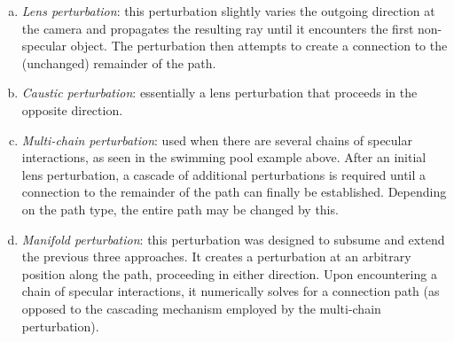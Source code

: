 \begin{enumerate}[(a)]
\item \emph{Lens perturbation}: this perturbation slightly varies the outgoing
direction at the camera and propagates the resulting ray until it encounters
the first non-specular object. The perturbation then attempts to create a connection to the
(unchanged) remainder of the path.
\item \emph{Caustic perturbation}: essentially a lens perturbation
that proceeds in the opposite direction.
\item \emph{Multi-chain perturbation}: used when there are several chains
of specular interactions, as seen in the swimming pool example above.
After an initial lens perturbation, a cascade of additional perturbations
is required until a connection to the
remainder of the path can finally be established. Depending on the
path type, the entire path may be changed by this.
\item \emph{Manifold perturbation}: this perturbation was designed to
subsume and extend the previous three approaches.
It creates a perturbation at an arbitrary
position along the path, proceeding in either direction. Upon encountering
a chain of specular interactions, it numerically solves for a
connection path (as opposed to the cascading mechanism employed by the
multi-chain perturbation).
\end{enumerate}
